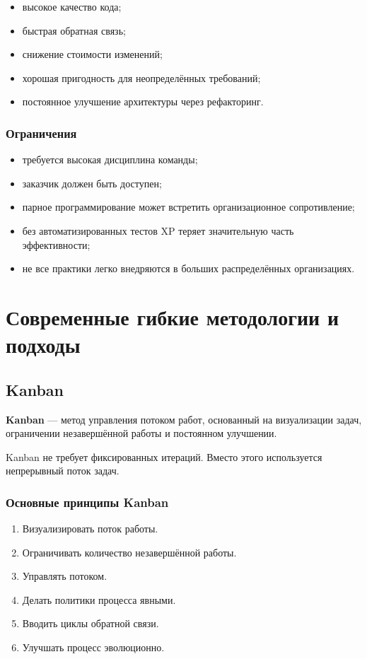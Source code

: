 \documentclass[12pt,a4paper]{article}
\begin{document}
\begin{itemize}
    \item высокое качество кода;
    \item быстрая обратная связь;
    \item снижение стоимости изменений;
    \item хорошая пригодность для неопределённых требований;
    \item постоянное улучшение архитектуры через рефакторинг.
\end{itemize}

\subsubsection*{Ограничения}

\begin{itemize}
    \item требуется высокая дисциплина команды;
    \item заказчик должен быть доступен;
    \item парное программирование может встретить организационное сопротивление;
    \item без автоматизированных тестов XP теряет значительную часть эффективности;
    \item не все практики легко внедряются в больших распределённых организациях.
\end{itemize}

\section{Современные гибкие методологии и подходы}

\subsection{Kanban}

\textbf{Kanban} --- метод управления потоком работ, основанный на визуализации задач, ограничении незавершённой работы и постоянном улучшении.

Kanban не требует фиксированных итераций. Вместо этого используется непрерывный поток задач.

\subsubsection{Основные принципы Kanban}

\begin{enumerate}
    \item Визуализировать поток работы.
    \item Ограничивать количество незавершённой работы.
    \item Управлять потоком.
    \item Делать политики процесса явными.
    \item Вводить циклы обратной связи.
    \item Улучшать процесс эволюционно.
\end{enumerate}
\end{document}
